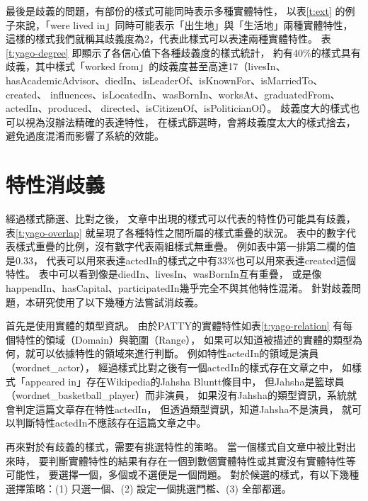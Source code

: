 最後是歧義的問題，有部份的樣式可能同時表示多種實體特性，
以表\ref{t:ext} 的例子來說，「were lived in」同時可能表示「出生地」與「生活地」兩種實體特性，這樣的樣式我們就稱其歧義度為2，代表此樣式可以表達兩種實體特性。
表\ref{t:yago-degree} 即顯示了各信心值下各種歧義度的樣式統計，
約有40\%的樣式具有歧義，其中樣式「worked from」的歧義度甚至高達17（livesIn、
hasAcademicAdvisor、diedIn、isLeaderOf、isKnownFor、isMarriedTo、created、
influences、isLocatedIn、wasBornIn、worksAt、graduatedFrom、actedIn、produced、
directed、isCitizenOf、isPoliticianOf）。
歧義度大的樣式也可以視為沒辦法精確的表達特性，
在樣式篩選時，會將歧義度太大的樣式捨去，
避免過度混淆而影響了系統的效能。



\section{特性消歧義}
\label{s:pattern-disambiguity}

經過樣式篩選、比對之後，
文章中出現的樣式可以代表的特性仍可能具有歧義，
表\ref{t:yago-overlap} 就呈現了各種特性之間所屬的樣式重疊的狀況。
表中的數字代表樣式重疊的比例，沒有數字代表兩組樣式無重疊。
例如表中第一排第二欄的值是0.33，
代表可以用來表達actedIn的樣式之中有33\%也可以用來表達created這個特性。
表中可以看到像是diedIn、livesIn、wasBornIn互有重疊，
或是像happendIn、hasCapital、participatedIn幾乎完全不與其他特性混淆。
針對歧義問題，本研究使用了以下幾種方法嘗試消歧義。



首先是使用實體的類型資訊。
由於PATTY的實體特性如表\ref{t:yago-relation} 有每個特性的領域（Domain）與範圍（Range），
如果可以知道被描述的實體的類型為何，就可以依據特性的領域來進行判斷。
例如特性actedIn的領域是演員（wordnet\_actor），
經過樣式比對之後有一個actedIn的樣式存在文章之中，
如樣式「appeared in」存在Wikipedia的Jahsha Bluntt條目中，
但Jahsha是籃球員（wordnet\_basketball\_player）而非演員，
如果沒有Jahsha的類型資訊，系統就會判定這篇文章存在特性actedIn，
但透過類型資訊，知道Jahsha不是演員，
就可以判斷特性actedIn不應該存在這篇文章之中。

再來對於有歧義的樣式，需要有挑選特性的策略。
當一個樣式自文章中被比對出來時，
要判斷實體特性的結果有存在一個到數個實體特性或其實沒有實體特性等可能性，
要選擇一個，多個或不選便是一個問題。
對於候選的樣式，有以下幾種選擇策略：(1) 只選一個、(2) 設定一個挑選門檻、(3) 全部都選。

